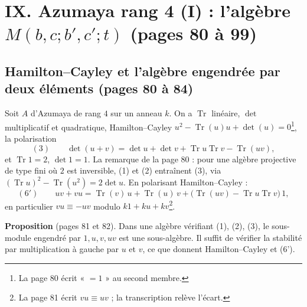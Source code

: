 \documentclass[11pt,a4paper]{article}
\begin{document}
\section*{IX. Azumaya rang 4 (I) : l'algèbre $M(b, c; b', c'; t)$ (pages 80 à 99)}

\subsection*{Hamilton--Cayley et l'algèbre engendrée par deux éléments (pages 80 à 84)}

Soit $A$ d'Azumaya de rang $4$ sur un anneau $k$. On a $\operatorname{Tr}$
linéaire, $\det$ multiplicatif et quadratique, Hamilton--Cayley
$u^2 - \operatorname{Tr}(u)u + \det(u) = 0$\footnote{La page 80 écrit « $=
1$ » au second membre.}, la polarisation
\[
  (3)\qquad \det(u + v) = \det u + \det v + \operatorname{Tr}u\operatorname{Tr}v -
  \operatorname{Tr}(uv),
\]
et $\operatorname{Tr}1 = 2$, $\det 1 = 1$. La remarque de la page 80 : pour une
algèbre projective de type fini où $2$ est inversible, (1) et (2) entraînent
(3), via $(\operatorname{Tr}u)^2 - \operatorname{Tr}(u^2) = 2\det u$. En
polarisant Hamilton--Cayley :
\[
  (6')\qquad uv + vu = \operatorname{Tr}(v)\,u + \operatorname{Tr}(u)\,v +
  \bigl(\operatorname{Tr}(uv) - \operatorname{Tr}u\operatorname{Tr}v\bigr)\,1,
\]
en particulier $vu \equiv -uv$ modulo $k1 + ku + kv$\footnote{La page 81 écrit
$vu \equiv uv$ ; la transcription relève l'écart.}.

\textbf{Proposition} (pages 81 et 82). Dans une algèbre vérifiant (1), (2),
(3), le sous-module engendré par $1, u, v, uv$ est une sous-algèbre. Il suffit
de vérifier la stabilité par multiplication à gauche par $u$ et $v$, ce que
donnent Hamilton--Cayley et (6').
\end{document}
